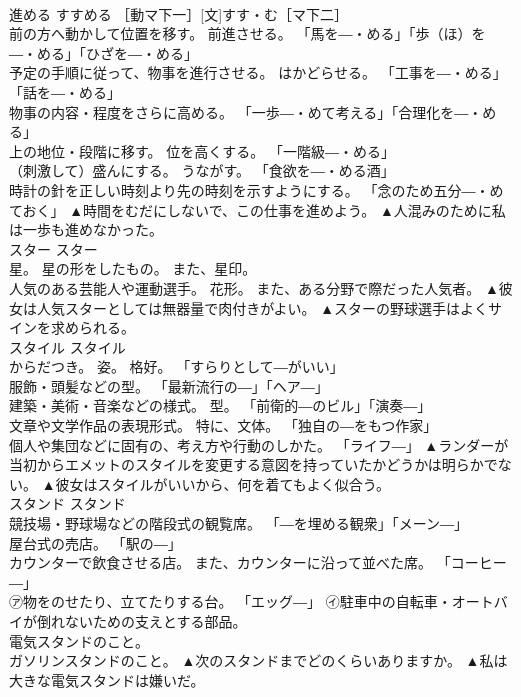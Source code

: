 \documentclass[8pt]{extreport}
\begin{document}
\begin{CJK}{UTF8}{min}
\\	進める	すすめる	［動マ下一］[文]すす・む［マ下二］ 
\\	前の方へ動かして位置を移す。 前進させる。 「馬を―・める」「歩（ほ）を―・める」「ひざを―・める」 
\\	予定の手順に従って、物事を進行させる。 はかどらせる。 「工事を―・める」「話を―・める」 
\\	物事の内容・程度をさらに高める。 「一歩―・めて考える」「合理化を―・める」 
\\	上の地位・段階に移す。 位を高くする。 「一階級―・める」 
\\	（刺激して）盛んにする。 うながす。 「食欲を―・める酒」 
\\	時計の針を正しい時刻より先の時刻を示すようにする。 「念のため五分―・めておく」	▲時間をむだにしないで、この仕事を進めよう。 ▲人混みのために私は一歩も進めなかった。
\\	スター	スター	
\\	星。 星の形をしたもの。 また、星印。 
\\	人気のある芸能人や運動選手。 花形。 また、ある分野で際だった人気者。	▲彼女は人気スターとしては無器量で肉付きがよい。 ▲スターの野球選手はよくサインを求められる。
\\	スタイル	スタイル	
\\	からだつき。 姿。 格好。 「すらりとして―がいい」 
\\	服飾・頭髪などの型。 「最新流行の―」「ヘア―」 
\\	建築・美術・音楽などの様式。 型。 「前衛的―のビル」「演奏―」 
\\	文章や文学作品の表現形式。 特に、文体。 「独自の―をもつ作家」 
\\	個人や集団などに固有の、考え方や行動のしかた。 「ライフ―」	▲ランダーが当初からエメットのスタイルを変更する意図を持っていたかどうかは明らかでない。 ▲彼女はスタイルがいいから、何を着てもよく似合う。
\\	スタンド	スタンド	
\\	競技場・野球場などの階段式の観覧席。 「―を埋める観衆」「メーン―」 
\\	屋台式の売店。 「駅の―」 
\\	カウンターで飲食させる店。 また、カウンターに沿って並べた席。 「コーヒー―」 
\\	㋐物をのせたり、立てたりする台。 「エッグ―」 ㋑駐車中の自転車・オートバイが倒れないための支えとする部品。 
\\	電気スタンドのこと。 
\\	ガソリンスタンドのこと。	▲次のスタンドまでどのくらいありますか。 ▲私は大きな電気スタンドは嫌いだ。

\end{CJK}
\end{document}
